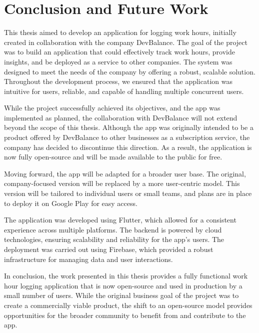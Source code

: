 \documentclass[
  digital,     %
  oneside,     %
  nosansbold,  %
  nocolorbold, %
  lof,         %
  lot,         %
]{fithesis4}
\begin{document}
\chapter{Conclusion and Future Work}
\shorthandoff{-}
\begin{markdown}

This thesis aimed to develop an application for logging work hours, initially created in collaboration with the company DevBalance. The goal of the project was to build an application that could effectively track work hours, provide insights, and be deployed as a service to other companies. The system was designed to meet the needs of the company by offering a robust, scalable solution. Throughout the development process, we ensured that the application was intuitive for users, reliable, and capable of handling multiple concurrent users.

While the project successfully achieved its objectives, and the app was implemented as planned, the collaboration with DevBalance will not extend beyond the scope of this thesis. Although the app was originally intended to be a product offered by DevBalance to other businesses as a subscription service, the company has decided to discontinue this direction. As a result, the application is now fully open-source and will be made available to the public for free.

Moving forward, the app will be adapted for a broader user base. The original, company-focused version will be replaced by a more user-centric model. This version will be tailored to individual users or small teams, and plans are in place to deploy it on Google Play for easy access.

The application was developed using Flutter, which allowed for a consistent experience across multiple platforms. The backend is powered by cloud technologies, ensuring scalability and reliability for the app’s users. The deployment was carried out using Firebase, which provided a robust infrastructure for managing data and user interactions.

In conclusion, the work presented in this thesis provides a fully functional work hour logging application that is now open-source and used in production by a small number of users. While the original business goal of the project was to create a commercially viable product, the shift to an open-source model provides opportunities for the broader community to benefit from and contribute to the app.

\end{markdown}
\shorthandon{-}
\end{document}
